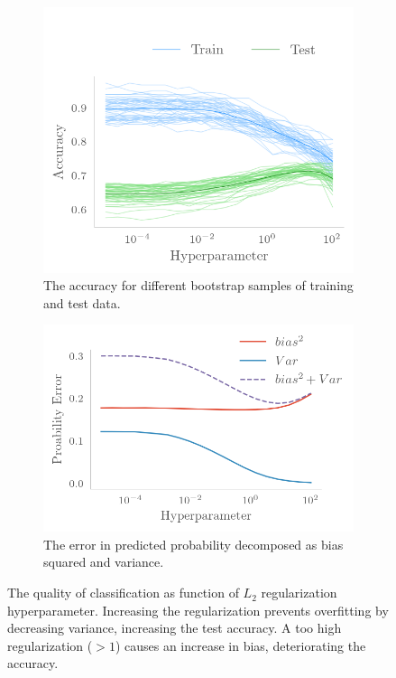 \begin{figure}[H]
    \centering
    \begin{subfigure}
        \centering
        \includegraphics{Figures/logreg_bootstrap.png}
        \caption{The accuracy for different bootstrap samples of training and
        test data.}
    \end{subfigure}
    \begin{subfigure}
        \centering 
        \includegraphics{Figures/logreg_biasvar.png}
        \caption{The error in predicted probability decomposed as bias squared and variance. }
    \end{subfigure}
    \caption{The quality of classification as function of $L_2$ regularization
    hyperparameter. Increasing the regularization prevents overfitting by decreasing variance, increasing the test accuracy. A too high regularization ($>1$) causes
    an increase in bias, deteriorating the accuracy.}
    \label{fig:logreg}
\end{figure}

